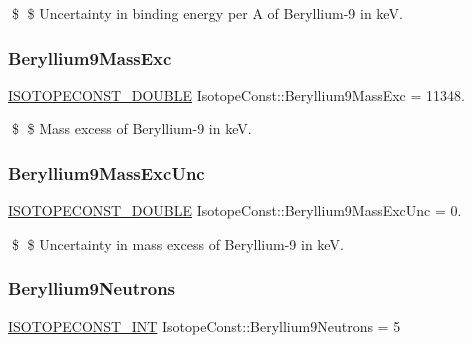 \$ \$ Uncertainty in binding energy per A of Beryllium-\/9 in keV. \mbox{\label{group___isotope_const-_beryllium-_be9_gab692f04996cd748b079fd72b50cf481e}} 
\subsubsection{\texorpdfstring{Beryllium9\+Mass\+Exc}{Beryllium9MassExc}}
{\footnotesize\ttfamily \mbox{\hyperlink{group___isotope_const-_macros_ga8f45a7272ce02c0b4c65c44636ed719a}{I\+S\+O\+T\+O\+P\+E\+C\+O\+N\+S\+T\+\_\+\+D\+O\+U\+B\+LE}} Isotope\+Const\+::\+Beryllium9\+Mass\+Exc = 11348.}

\$ \$ Mass excess of Beryllium-\/9 in keV. \mbox{\label{group___isotope_const-_beryllium-_be9_ga1754c62404311e4a28d58805ebc6557d}} 
\subsubsection{\texorpdfstring{Beryllium9\+Mass\+Exc\+Unc}{Beryllium9MassExcUnc}}
{\footnotesize\ttfamily \mbox{\hyperlink{group___isotope_const-_macros_ga8f45a7272ce02c0b4c65c44636ed719a}{I\+S\+O\+T\+O\+P\+E\+C\+O\+N\+S\+T\+\_\+\+D\+O\+U\+B\+LE}} Isotope\+Const\+::\+Beryllium9\+Mass\+Exc\+Unc = 0.}

\$ \$ Uncertainty in mass excess of Beryllium-\/9 in keV. \mbox{\label{group___isotope_const-_beryllium-_be9_gad24d22e80b6f814d52c31407982efc5c}} 
\subsubsection{\texorpdfstring{Beryllium9\+Neutrons}{Beryllium9Neutrons}}
{\footnotesize\ttfamily \mbox{\hyperlink{group___isotope_const-_macros_ga5f18360b3e99483a35c32d789e62621c}{I\+S\+O\+T\+O\+P\+E\+C\+O\+N\+S\+T\+\_\+\+I\+NT}} Isotope\+Const\+::\+Beryllium9\+Neutrons = 5}


